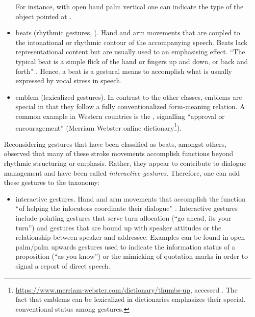 \documentclass[output=paper]{langsci/langscibook}
\begin{document}
\begin{itemize}
%
For instance, with open hand palm vertical one can indicate the type of the object pointed at \citep[]{Kendon:Versante:2003}.
\item beats  (rhythmic gestures, ). Hand and arm movements that are coupled to the intonational or rhythmic contour of the accompanying speech. Beats lack representational content but are usually used to an emphasising effect. \enquote{The typical beat is a simple flick of the hand or fingers up and down, or back and forth} \citep[]{McNeill:1992}. Hence, a beat is a gestural means to accomplish what is usually expressed by vocal stress in speech. 
\item emblem   (lexicalized gestures). In contrast to the other classes, emblems are special in that they follow a fully conventionalized form-meaning relation. A common example in Western countries is the , signalling \enquote{approval or encouragement} (Merriam Webster online dictionary\footnote{\url{https://www.merriam-webster.com/dictionary/thumbs-up}, accessed . The fact that emblems can be lexicalized in dictionaries emphasizes their special, conventional status among gestures.}).
\end{itemize}


Reconsidering gestures that have been classified as beats, amongst others, \citet{Bavelas:Chovil:Lawrie:Wade:1992} observed that many of these stroke movements accomplish functions beyond rhythmic structuring or emphasis.
%
Rather, they appear to contribute to dialogue management and have been called \emph{interactive gestures}.
%
Therefore, one can add these gestures to the taxonomy:

\begin{itemize}
\item interactive gestures.  Hand and arm movements that accomplish the function \enquote{of helping the inlocutors coordinate their dialogue} \citep[]{Bavelas:Chovil:Coates:Roe:1995}. Interactive gestures include pointing gestures that serve turn allocation (\enquote{go ahead, its your turn}) and gestures that are bound up with speaker attitudes or the relationship between speaker and addressee. Examples can be found in open palm/palm upwards gestures used to indicate the information status of a proposition (\enquote{as you know}) or the mimicking of quotation marks in order to signal a report of direct speech.
\end{itemize}
\end{document}
